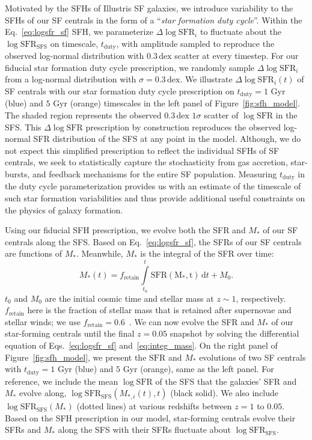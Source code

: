 \documentclass[12pt, letterpaper, preprint, tighten]{aastex62}
\newcommand{\beq}{\begin{equation}}
\newcommand{\eeq}{\end{equation}}
\newcommand{\logsfr}{\log\mathrm{SFR}}
\newcommand{\logsfrsfs}{\log\mathrm{SFR}_\mathrm{SFS}}
\begin{document}
Motivated by the SFHs of Illustris SF galaxies, we introduce variability 
to the SFHs of our SF centrals in the form of a ``\emph{star formation duty cycle}''. 
Within the Eq.~\ref{eq:logsfr_sf} SFH, we parameterize $\Delta \logsfr_i$ to 
fluctuate about the $\logsfrsfs$ on timescale, $t_\mathrm{duty}$, with 
amplitude sampled to reproduce the observed log-normal distribution with 
$0.3\,\mathrm{dex}$ scatter at every timestep. For our fiducial star 
formation duty cycle prescription, we randomly sample $\Delta \logsfr_i$ 
from a log-normal distribution with $\sigma = 0.3\,\mathrm{dex}$. We 
illustrate $\Delta \logsfr_i(t)$ of SF centrals with our star formation 
duty cycle prescription on $t_\mathrm{duty}=1$ Gyr (blue) and $5$ Gyr (orange) 
timescales in the left panel of Figure~\ref{fig:sfh_model}. 
The shaded region represents the observed $0.3\,\mathrm{dex}$ $1\sigma$ 
scatter of $\logsfr$ in the SFS. This $\Delta \logsfr$ prescription by 
construction reproduces the observed log-normal SFR distribution of the SFS 
at any point in the model. Although, we do not expect this simplified 
prescription to reflect the individual SFHs of SF centrals, 
we seek to statistically capture the stochasticity from gas accretion, 
star-bursts, and feedback mechanisms for the entire SF population. 
Measuring $t_\mathrm{duty}$ in the duty cycle parameterization
provides us with an estimate of the timescale of such star formation 
variabilities and thus provide additional useful constraints on the 
physics of galaxy formation. 

Using our fiducial SFH prescription, we evolve both the SFR and $M_*$ 
of our SF centrals along the SFS. Based on Eq.~\ref{eq:logsfr_sf},
the SFRs of our SF centrals are functions of $M_*$. Meanwhile, $M_*$ 
is the integral of the SFR over time: 
\beq \label{eq:integ_mass} 
M_*(t) = f_\mathrm{retain} \int\limits_{t_0}^{t} \mathrm{SFR(M_*, t)}\,\mathrm{d}t + M_0. 
\eeq
$t_0$ and $M_0$ are the initial cosmic time and stellar mass at $z \sim 1$, 
respectively. $f_\mathrm{retain}$ here is the fraction of stellar mass 
that is retained after supernovae and stellar winds; we use 
$f_\mathrm{retain} = 0.6$~\citep{wetzel2013}. We can now evolve the SFR and 
$M_*$ of our star-forming centrals until the final $z=0.05$ snapshot by 
solving the differential equation of Eqs.~\ref{eq:logsfr_sf} and~\ref{eq:integ_mass}. 
On the right panel of Figure~\ref{fig:sfh_model}, we present the 
$\mathrm{SFR}$ and $M_*$ evolutions of two SF centrals with 
$t_\mathrm{duty}=1$ Gyr (blue) and $5$ Gyr (orange), same 
as the left panel. For reference, we include the mean $\logsfr$ of the SFS 
that the galaxies' SFR and $M_*$ evolve along, $\logsfrsfs(M_{*,i}(t), t)$ 
(black solid). We also include $\logsfrsfs(M_*)$ (dotted lines) at various 
redshifts between $z = 1$ to $0.05$. Based on the SFH prescription in our 
model, star-forming centrals evolve their SFRs and $M_*$ along the SFS 
with their SFRs fluctuate about $\logsfrsfs$.
\end{document}
